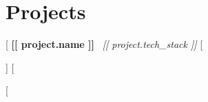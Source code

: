 \section{Projects}

[%
    \hspace{0.5em} \textbf{[[ project.name ]]} \textbar \  \textit{[[ project.tech_stack ]]}
    [%

    \vspace{0.10 cm}
    \begin{onecolentry}
        \begin{highlights}
            [%
            \item [[ bullet ]]
            [%
        \end{highlights}
    \end{onecolentry}
    \vspace{0.10 cm}

[%
